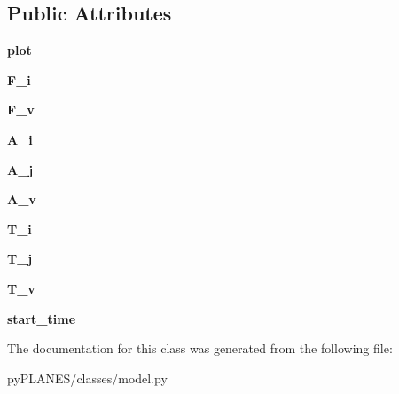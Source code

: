 \subsection*{Public Attributes}
\begin{DoxyCompactItemize}
\item 
\mbox{\label{classpy_p_l_a_n_e_s_1_1classes_1_1model_1_1_model_ae907e606a369b6e34d139247ac79d555}} 
{\bfseries plot}
\item 
\mbox{\label{classpy_p_l_a_n_e_s_1_1classes_1_1model_1_1_model_af220822f3071ae1df209e8abc39b8884}} 
{\bfseries F\+\_\+i}
\item 
\mbox{\label{classpy_p_l_a_n_e_s_1_1classes_1_1model_1_1_model_aee1987677d6e6b14addafdf0c1a49ff5}} 
{\bfseries F\+\_\+v}
\item 
\mbox{\label{classpy_p_l_a_n_e_s_1_1classes_1_1model_1_1_model_a93996577615d4d6717f93b42032b0f50}} 
{\bfseries A\+\_\+i}
\item 
\mbox{\label{classpy_p_l_a_n_e_s_1_1classes_1_1model_1_1_model_a83d62229044648b09d2cdd3eb75a4bad}} 
{\bfseries A\+\_\+j}
\item 
\mbox{\label{classpy_p_l_a_n_e_s_1_1classes_1_1model_1_1_model_a8c597b56cbbd022f1f16c09d2b4ca0ce}} 
{\bfseries A\+\_\+v}
\item 
\mbox{\label{classpy_p_l_a_n_e_s_1_1classes_1_1model_1_1_model_ae68c961988c3501fa63e9ad27abdd6e5}} 
{\bfseries T\+\_\+i}
\item 
\mbox{\label{classpy_p_l_a_n_e_s_1_1classes_1_1model_1_1_model_abf6d2c66127f70d0290c470ad25d6c2b}} 
{\bfseries T\+\_\+j}
\item 
\mbox{\label{classpy_p_l_a_n_e_s_1_1classes_1_1model_1_1_model_a6dc88c9b37fc8e245fa0d079ebf19653}} 
{\bfseries T\+\_\+v}
\item 
\mbox{\label{classpy_p_l_a_n_e_s_1_1classes_1_1model_1_1_model_af107d1782fb62471d9b31197f8d4f193}} 
{\bfseries start\+\_\+time}
\end{DoxyCompactItemize}


The documentation for this class was generated from the following file\+:\begin{DoxyCompactItemize}
\item 
py\+P\+L\+A\+N\+E\+S/classes/model.\+py\end{DoxyCompactItemize}
